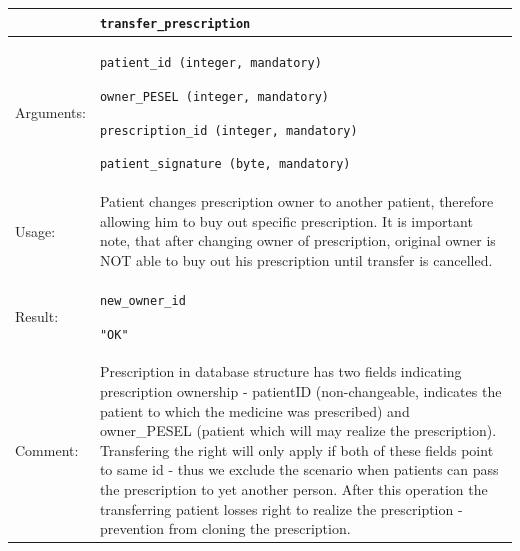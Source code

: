 \newpage

    \begin{longtable}{| p{3cm} | p{10.75cm} |}
    \hline
     & \texttt{transfer\_prescription}\\ \hline
    Arguments: &  \begin{packed_enum}
    	\item \texttt{patient\_id (integer, mandatory)}
    	\item \texttt{owner\_PESEL (integer, mandatory)}
		\item \texttt{prescription\_id (integer, mandatory)}
		\item \texttt{patient\_signature (byte, mandatory)}
	\end{packed_enum}     \\ \hline
    Usage: & Patient changes prescription owner to another patient, therefore allowing him to buy out specific prescription. It is important note, that after changing owner of prescription, original owner is NOT able to buy out his prescription until transfer is cancelled. \\ \hline
    Result: & \begin{packed_enum}
    	\item \texttt{new\_owner\_id}
		\item \texttt{"OK"}

	\end{packed_enum}     \\ \hline	
		Comment: & Prescription in database structure has two fields indicating prescription ownership - patientID (non-changeable, indicates the patient to which the medicine was prescribed) and owner\_PESEL (patient which will may realize the prescription).
		Transfering the right will only apply if both of these fields point to same id - thus we exclude the scenario when patients can pass the prescription to yet another person. After this operation the transferring patient losses right to realize the prescription - prevention from cloning the prescription.\\ \hline
    \end{longtable}



